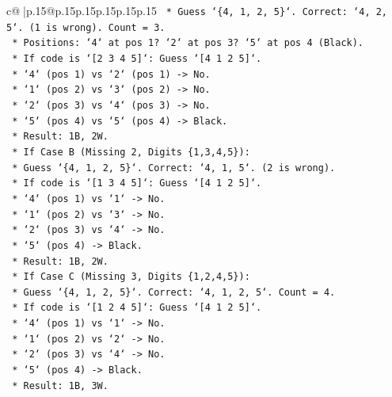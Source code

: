 \documentclass{article}
\begin{document}
{\begin{supertabular}{c@{$\;$}|p{.15\linewidth}@{}p{.15\linewidth}p{.15\linewidth}p{.15\linewidth}p{.15\linewidth}p{.15\linewidth}}
{{{\texttt{            *   Guess `\{4, 1, 2, 5\}`. Correct: `4, 2, 5`. (1 is wrong). Count = 3.} \\
\texttt{            *   Positions: `4` at pos 1? `2` at pos 3? `5` at pos 4 (Black).} \\
\texttt{            *   If code is `{[}2 3 4 5{]}`: Guess `{[}4 1 2 5{]}`.} \\
\texttt{                *   `4` (pos 1) vs `2` (pos 1) {-}> No.} \\
\texttt{                *   `1` (pos 2) vs `3` (pos 2) {-}> No.} \\
\texttt{                *   `2` (pos 3) vs `4` (pos 3) {-}> No.} \\
\texttt{                *   `5` (pos 4) vs `5` (pos 4) {-}> Black.} \\
\texttt{                *   Result: 1B, 2W.} \\
\texttt{        *   If Case B (Missing 2, Digits \{1,3,4,5\}):} \\
\texttt{            *   Guess `\{4, 1, 2, 5\}`. Correct: `4, 1, 5`. (2 is wrong).} \\
\texttt{            *   If code is `{[}1 3 4 5{]}`: Guess `{[}4 1 2 5{]}`.} \\
\texttt{                *   `4` (pos 1) vs `1` {-}> No.} \\
\texttt{                *   `1` (pos 2) vs `3` {-}> No.} \\
\texttt{                *   `2` (pos 3) vs `4` {-}> No.} \\
\texttt{                *   `5` (pos 4) {-}> Black.} \\
\texttt{                *   Result: 1B, 2W.} \\
\texttt{        *   If Case C (Missing 3, Digits \{1,2,4,5\}):} \\
\texttt{            *   Guess `\{4, 1, 2, 5\}`. Correct: `4, 1, 2, 5`. Count = 4.} \\
\texttt{            *   If code is `{[}1 2 4 5{]}`: Guess `{[}4 1 2 5{]}`.} \\
\texttt{                *   `4` (pos 1) vs `1` {-}> No.} \\
\texttt{                *   `1` (pos 2) vs `2` {-}> No.} \\
\texttt{                *   `2` (pos 3) vs `4` {-}> No.} \\
\texttt{                *   `5` (pos 4) {-}> Black.} \\
\texttt{                *   Result: 1B, 3W.} \\
\\ 
}}}
\end{supertabular}}
\end{document}

